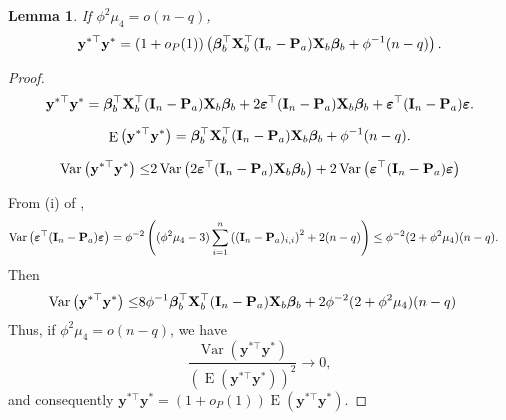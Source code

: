 \documentclass[11pt]{article}
\DeclareMathOperator{\myE}{E}
\DeclareMathOperator{\myVar}{Var}
\newcommand{\By}{\mathbf{y}}    \newcommand{\Bz}{\mathbf{z}}
\newcommand{\bfsym}[1]{\ensuremath{\boldsymbol{#1}}}
\def\bbeta{\bfsym \beta}
\theoremstyle{plain}
\newtheorem{lemma}{\quad\quad Lemma}
\theoremstyle{definition}
\theoremstyle{remark}
\begin{document}
\begin{lemma}\label{lemma:denom}
If $\phi^2\mu_4=o(n-q)$,
\begin{equation*}
    \By^{*\top} \By^*=(1+o_P(1))
    \left(
    \bbeta_b^\top \BX_b^\top (\BI_n-\BP_a) \BX_b \bbeta_b
    + \phi^{-1}(n-q)
\right).
\end{equation*}
\end{lemma}
\begin{proof}
\begin{equation*}
    \By^{*\top} \By^* = \bbeta_b^\top \BX_b^\top (\BI_n-\BP_a) \BX_b \bbeta_b
    +2 \bepsilon^\top (\BI_n -\BP_a) \BX_b \bbeta_b + \bepsilon^\top (\BI_n - \BP_a) \bepsilon.
\end{equation*}


\begin{equation*}
    \myE \left(\By^{*\top} \By^*\right) = \bbeta_b^\top \BX_b^\top (\BI_n-\BP_a) \BX_b \bbeta_b
    + \phi^{-1}(n-q).
\end{equation*}


\begin{equation*}
    \begin{split}
    \myVar \left( \By^{*\top} \By^* \right) 
    \leq  &
    2\myVar \left( 2 \bepsilon^\top (\BI_n -\BP_a) \BX_b \bbeta_b \right) + 2\myVar \left( \bepsilon^\top (\BI_n - \BP_a) \bepsilon \right)
    \\
    \end{split}
\end{equation*}

From (i) of \cite[Proposition A.1]{chen2010tests},
\begin{equation*}
    \begin{split}
\myVar\left( \bepsilon^\top (\BI_n - \BP_a) \bepsilon \right)
&=
\phi^{-2}\left(
    (\phi^2 \mu_4 - 3) \sum_{i=1}^n \left((\BI_n -\BP_a)_{i,i}\right)^2
    + 2(n-q)
\right)
    \leq
    \phi^{-2}(2+\phi^2 \mu_4)(n-q)
    .
    \end{split}
\end{equation*}
Then
\begin{equation*}
    \begin{split}
    \myVar \left( \By^{*\top} \By^* \right) 
    \leq  &
    8 \phi^{-1} \bbeta_b^\top \BX_b^\top (\BI_n -\BP_a) \BX_b \bbeta_b 
    +
    2 \phi^{-2} (2+\phi^2 \mu_4) (n-q)
    \end{split}
\end{equation*}
Thus, if $\phi^2\mu_4=o(n-q)$, we have
\begin{equation*}
    \frac{
        \myVar \left( \By^{*\top} \By^* \right) 
    }{
        \left(\myE \left( \By^{*\top} \By^* \right) \right)^2
    }
    \to 0,
\end{equation*}
and consequently $\By^{*\top} \By^*=(1+o_P(1))\myE (\By^{*\top} \By^*)$.

\end{proof}
\end{document}
